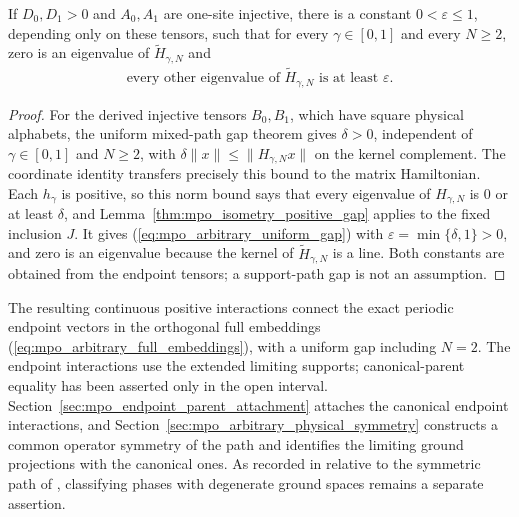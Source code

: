 \begin{lemma}
    \label{thm:mpo_arbitrary_uniform_path_gap}
    \leanok
    If $D_0,D_1>0$ and $A_0,A_1$ are one-site injective, there is a
    constant $0<\varepsilon\leq1$, depending only on these tensors,
    such that for every $\gamma\in[0,1]$ and every $N\geq2$, zero is an
    eigenvalue of $\widetilde H_{\gamma,N}$ and
    \begin{align}
        \text{every other eigenvalue of }\widetilde H_{\gamma,N}
        \text{ is at least }\varepsilon.
        \label{eq:mpo_arbitrary_uniform_gap}
    \end{align}
\end{lemma}
\begin{proof}\leanok
    For the derived injective tensors $B_0,B_1$, which have square physical
    alphabets, the uniform mixed-path gap theorem gives $\delta>0$,
    independent of $\gamma\in[0,1]$ and $N\geq2$, with
    $\delta\|x\|\leq\|H_{\gamma,N}x\|$ on the
    kernel complement. The coordinate identity transfers precisely
    this bound to the matrix Hamiltonian. Each $h_\gamma$ is positive,
    so this norm bound says that every eigenvalue of $H_{\gamma,N}$ is $0$
    or at least $\delta$, and Lemma~\ref{thm:mpo_isometry_positive_gap}
    applies to the fixed inclusion $J$. It gives
    (\ref{eq:mpo_arbitrary_uniform_gap}) with
    $\varepsilon=\min\{\delta,1\}>0$, and zero is an eigenvalue because
    the kernel of $\widetilde H_{\gamma,N}$ is a line. Both constants are obtained
    from the endpoint tensors; a support-path gap is not an assumption.
\end{proof}

The resulting continuous positive interactions connect the exact periodic
endpoint vectors in the orthogonal full embeddings
(\ref{eq:mpo_arbitrary_full_embeddings}), with a uniform gap including
$N=2$. The endpoint interactions use the extended limiting supports;
canonical-parent equality has been asserted only in the open interval.
Section~\ref{sec:mpo_endpoint_parent_attachment} attaches the canonical
endpoint interactions, and Section~\ref{sec:mpo_arbitrary_physical_symmetry}
constructs a common operator symmetry of the path and identifies the
limiting ground projections with the canonical ones. As recorded in
\cite{gap:glm23_mpo_symmetric_mps_scope} relative to the symmetric path of
\cite[Section~5]{GarreRubio2023MPOSym}, classifying phases with degenerate
ground spaces remains a separate assertion.
